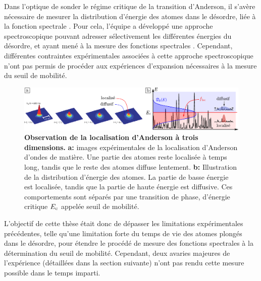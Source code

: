 Dans l'optique de sonder le régime critique de la transition d'Anderson, il s'avère nécessaire de mesurer la distribution d'énergie des atomes dans le désordre, liée à la fonction spectrale \citep{pasek2017anderson}. Pour cela, l'équipe a développé une approche spectroscopique pouvant adresser sélectivement les différentes énergies du désordre, et ayant mené à la mesure des fonctions spectrales \citep{volchkov2018measurement}\citep{denechaud2018vers}. Cependant, différentes contraintes expérimentales associées à cette approche spectroscopique n'ont pas permis de procéder aux expériences d'expansion nécessaires à la mesure du seuil de mobilité.

\begin{figure}
\centering
\includegraphics[width=\textwidth]{Fig/Introduction/AL3D.pdf}
\caption{\textbf{Observation de la localisation d'Anderson à trois dimensions.} \textbf{a:} images expérimentales de la localisation d'Anderson d'ondes de matière. Une partie des atomes reste localisée à temps long, tandis que le reste des atomes diffuse lentement. \textbf{b:} Illustration de la distribution d'énergie des atomes. La partie de basse énergie est localisée, tandis que la partie de haute énergie est diffusive. Ces comportements sont séparés par une transition de phase, d'énergie critique $E_{\mathrm{c}}$ appelée seuil de mobilité.}
\label{fig:AL3D}
\end{figure}

L'objectif de cette thèse était donc de dépasser les limitations expérimentales précédentes, telle qu'une limitation forte du temps de vie des atomes plongés dans le désordre, pour étendre le procédé de mesure des fonctions spectrales à la détermination du seuil de mobilité. Cependant, deux avaries majeures de l'expérience (détaillées dans la section suivante) n'ont pas rendu cette mesure possible dans le temps imparti. 

